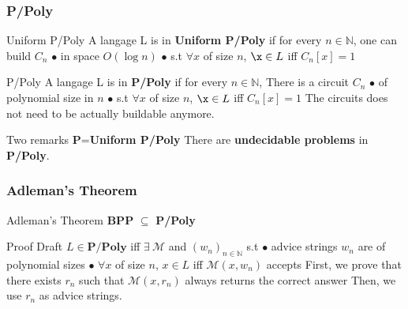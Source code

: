\documentclass[pdf]{beamer}
\newcommand{\mc}[1]{\mathcal{#1}} %
\newcommand{\N}{\ensuremath{\mathbb{N}}}
\begin{document}
\begin{frame}
\frametitle{P/Poly}

\begin{block}{Uniform P/Poly}
A langage L is in \textbf{Uniform P/Poly} if for every $n\in \N$, one can build $C_n$ \newline
$\bullet $ in space $O(\log n)$\newline
$\bullet$ s.t $\forall x$ of size $n$, $\x \in L$ iff $C_n[x]=1$\newline
\end{block}

\begin{block}{P/Poly}
A langage L is in \textbf{P/Poly} if for every $n\in \N$, There is a circuit $C_n$ \newline
$\bullet $ of polynomial size in $n$ \newline
$\bullet$ s.t $\forall x$ of size $n$, $\x \in L$ iff $C_n[x]=1$\newline
The circuits does not need to be actually buildable anymore.
\end{block}

\begin{exampleblock}{Two remarks}
\textbf{P}=\textbf{Uniform P/Poly}\newline
There are \textbf{undecidable problems} in \textbf{P/Poly}.
\end{exampleblock}

\end{frame}

\begin{frame}
\frametitle{Adleman's Theorem}

\begin{alertblock}{Adleman's Theorem}
\textbf{BPP} $\subseteq$ \textbf{P/Poly}
\end{alertblock}

\begin{exampleblock}{Proof Draft}
$L \in \mathbf{P/Poly}$ iff $\exists~\mc{M}$ and $(w_n)_{n\in\N}$ s.t \newline
$\bullet$ advice strings $w_n$ are of polynomial sizes \newline
$\bullet$ $\forall x$ of size $n$, $x \in L$ iff $\mc{M}(x,w_n)$ accepts \newline
First, we prove that there exists $r_n$ such that $\mc{M}(x,r_n)$ always returns the correct answer \newline
Then, we use $r_n$ as advice strings.
\end{exampleblock}

\end{frame}
\end{document}
